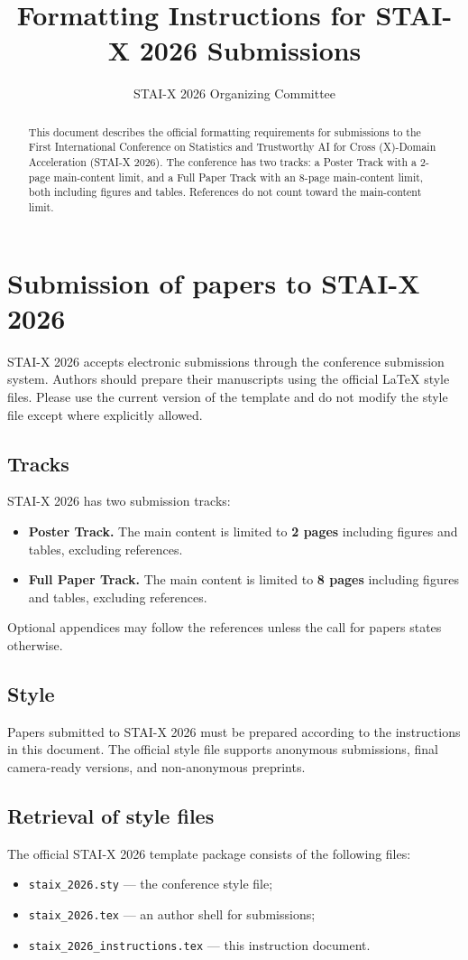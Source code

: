 \documentclass{article}
\title{Formatting Instructions for STAI-X 2026 Submissions}
\author{STAI-X 2026 Organizing Committee}
\begin{document}
\maketitle

\begin{abstract}
This document describes the official formatting requirements for submissions to the First International Conference on Statistics and Trustworthy AI for Cross (X)-Domain Acceleration
 (STAI-X 2026). The conference has two tracks: a Poster Track with a 2-page main-content limit, and a Full Paper Track with an 8-page main-content limit, both including figures and tables. References do not count toward the main-content limit.
\end{abstract}

\section{Submission of papers to STAI-X 2026}
STAI-X 2026 accepts electronic submissions through the conference submission system. Authors should prepare their manuscripts using the official \LaTeX{} style files. Please use the current version of the template and do not modify the style file except where explicitly allowed.

\subsection{Tracks}
STAI-X 2026 has two submission tracks:
\begin{itemize}
    \item \textbf{Poster Track.} The main content is limited to \textbf{2 pages} including figures and tables, excluding references.
    \item \textbf{Full Paper Track.} The main content is limited to \textbf{8 pages} including figures and tables, excluding references.
\end{itemize}
Optional appendices may follow the references unless the call for papers states otherwise.

\subsection{Style}
Papers submitted to STAI-X 2026 must be prepared according to the instructions in this document. The official style file supports anonymous submissions, final camera-ready versions, and non-anonymous preprints.

\subsection{Retrieval of style files}
The official STAI-X 2026 template package consists of the following files:
\begin{itemize}
    \item \verb|staix_2026.sty| --- the conference style file;
    \item \verb|staix_2026.tex| --- an author shell for submissions;
    \item \verb|staix_2026_instructions.tex| --- this instruction document.
\end{itemize}
\end{document}
